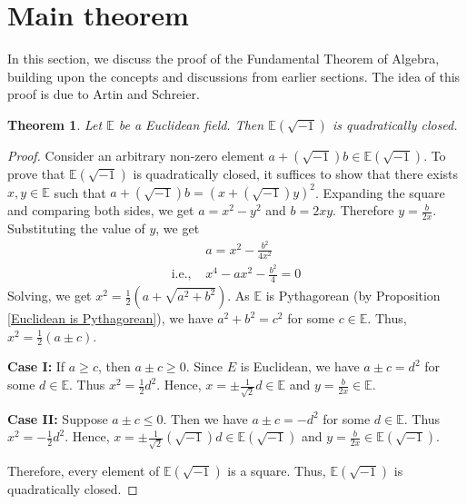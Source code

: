 \documentclass[sn-mathphys-num]{sn-jnl}%
\newtheorem{theorem}{Theorem}[section]
\begin{document}
\section{Main theorem}
In this section, we discuss the proof of the Fundamental Theorem of Algebra, building upon the concepts and discussions from earlier sections. The idea of this proof is due to Artin and Schreier.
\medskip 

\begin{theorem}\label{Euclidean is quad closed}
    Let $\mathbb E$ be a Euclidean field. Then $\mathbb E(\sqrt{-1})$ is quadratically closed. 
\end{theorem}
\begin{proof}
    Consider an arbitrary non-zero element $a+(\sqrt{-1})b \in \mathbb E(\sqrt{-1})$. To prove that $\mathbb E(\sqrt{-1})$ is quadratically closed, it suffices to show that there exists $x,y \in \mathbb E$ such that  $a+(\sqrt{-1})b=(x+(\sqrt{-1})y)^2$. Expanding the square and comparing both sides, we get $a=x^2-y^2$ and $b=2xy$. Therefore $y=\frac{b}{2x}$. Substituting the value of $y$, we get
\begin{align*}
    & a=x^2- \frac{b^2}{4x^2}\\ 
     \text{i.e., } &x^4-ax^2-\frac{b^2}{4}=0
\end{align*}
    Solving, we get $x^2=\frac{1}{2}(a+\sqrt{a^2+b^2})$. As $\mathbb E$ is Pythagorean (by Proposition \ref{Euclidean is Pythagorean}), we have $a^2+b^2=c^2$ for some $c \in \mathbb E$. Thus, $x^2=\frac{1}{2}(a \pm c)$. 
    \medskip 
    
    \textbf{Case I:} If $a\geq c$, then $a \pm c \geq 0$. Since $E$ is Euclidean, we have $a \pm c =d^2$ for some $d \in \mathbb E$. Thus $x^2=\frac{1}{2}d^2$. Hence, $x= \pm \frac{1}{\sqrt{2}}d \in \mathbb E$ and $y=\frac{b}{2x} \in \mathbb E$.
\medskip 

    \textbf{Case II:} Suppose $a \pm c \leq 0$. Then we have $a \pm c = -d^2$ for some $d \in \mathbb E$. Thus  $x^2=-\frac{1}{2}d^2$. Hence, $x= \pm \frac{1}{\sqrt{2}}(\sqrt{-1})d \in \mathbb E(\sqrt{-1})$ and $y=\frac{b}{2x} \in \mathbb E(\sqrt{-1})$.
    
    Therefore, every element of $\mathbb E(\sqrt{-1})$ is a square. Thus, $\mathbb E(\sqrt{-1})$ is quadratically closed.
\end{proof}
\medskip 
\end{document}
